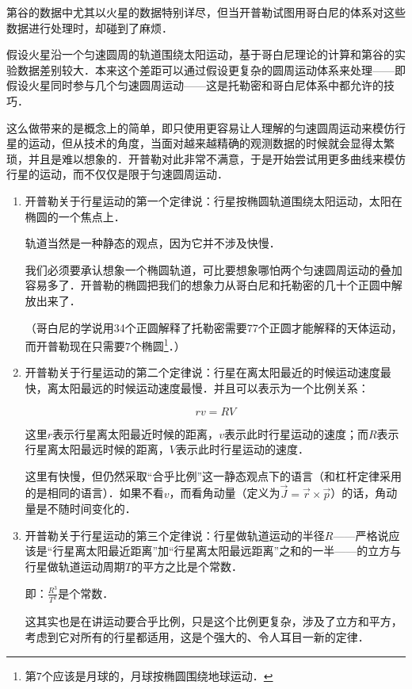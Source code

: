 第谷的数据中尤其以火星的数据特别详尽，但当开普勒试图用哥白尼的体系对这些数据进行处理时，却碰到了麻烦．

假设火星沿一个匀速圆周的轨道围绕太阳运动，基于哥白尼理论的计算和第谷的实验数据差别较大．本来这个差距可以通过假设更复杂的圆周运动体系来处理——即假设火星同时参与几个匀速圆周运动——这是托勒密和哥白尼体系中都允许的技巧．

这么做带来的是概念上的简单，即只使用更容易让人理解的匀速圆周运动来模仿行星的运动，但从技术的角度，当面对越来越精确的观测数据的时候就会显得太繁琐，并且是难以想象的．开普勒对此非常不满意，于是开始尝试用更多曲线来模仿行星的运动，而不仅仅是限于匀速圆周运动．

\begin{enumerate}
\item 

开普勒关于行星运动的第一个定律说：行星按椭圆轨道围绕太阳运动，太阳在椭圆的一个焦点上．

轨道当然是一种静态的观点，因为它并不涉及快慢．

我们必须要承认想象一个椭圆轨道，可比要想象哪怕两个匀速圆周运动的叠加容易多了．开普勒的椭圆把我们的想象力从哥白尼和托勒密的几十个正圆中解放出来了．

（哥白尼的学说用34个正圆解释了托勒密需要77个正圆才能解释的天体运动，而开普勒现在只需要7个椭圆\footnote{第7个应该是月球的，月球按椭圆围绕地球运动．}．）

\item

开普勒关于行星运动的第二个定律说：行星在离太阳最近的时候运动速度最快，离太阳最远的时候运动速度最慢．并且可以表示为一个比例关系：

\begin{equation}
r v = R V
\end{equation}

这里$r$表示行星离太阳最近时候的距离，$v$表示此时行星运动的速度；而$R$表示行星离太阳最远时候的距离，$V$表示此时行星运动的速度．

这里有快慢，但仍然采取“合乎比例”这一静态观点下的语言（和杠杆定律采用的是相同的语言）．如果不看$v$，而看角动量（定义为$\vec J = \vec r \times \vec p$）的话，角动量是不随时间变化的．

\item

开普勒关于行星运动的第三个定律说：行星做轨道运动的半径$R$——严格说应该是“行星离太阳最近距离”加“行星离太阳最远距离”之和的一半——的立方与行星做轨道运动周期$T$的平方之比是个常数．

即：$\frac{R^3}{T^2} $是个常数．

这其实也是在讲运动要合乎比例，只是这个比例更复杂，涉及了立方和平方，考虑到它对所有的行星都适用，这是个强大的、令人耳目一新的定律．

\end{enumerate}


